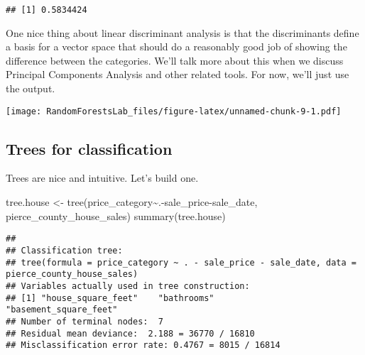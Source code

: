 \documentclass[
]{article}
\newenvironment{Shaded}{\begin{snugshade}}{\end{snugshade}}
\newcommand{\AttributeTok}[1]{\textcolor[rgb]{0.77,0.63,0.00}{#1}}
\newcommand{\FunctionTok}[1]{\textcolor[rgb]{0.00,0.00,0.00}{#1}}
\newcommand{\NormalTok}[1]{#1}
\newcommand{\OtherTok}[1]{\textcolor[rgb]{0.56,0.35,0.01}{#1}}
\newcommand{\SpecialCharTok}[1]{\textcolor[rgb]{0.00,0.00,0.00}{#1}}
\begin{document}
\begin{verbatim}
## [1] 0.5834424
\end{verbatim}

One nice thing about linear discriminant analysis is that the
discriminants define a basis for a vector space that should do a
reasonably good job of showing the difference between the categories.
We'll talk more about this when we discuss Principal Components Analysis
and other related tools. For now, we'll just use the output.

\begin{Shaded}
\end{Shaded}

\texttt{[image: RandomForestsLab\_files/figure-latex/unnamed-chunk-9-1.pdf]}

\hypertarget{trees-for-classification}{%
\subsection{Trees for classification}\label{trees-for-classification}}

Trees are nice and intuitive. Let's build one.

\begin{Shaded}
\begin{Highlighting}[]
\NormalTok{tree.house }\OtherTok{\textless{}{-}} \FunctionTok{tree}\NormalTok{(price\_category}\SpecialCharTok{\textasciitilde{}}\NormalTok{.}\SpecialCharTok{{-}}\NormalTok{sale\_price}\SpecialCharTok{{-}}\NormalTok{sale\_date, pierce\_county\_house\_sales)}
\FunctionTok{summary}\NormalTok{(tree.house)}
\end{Highlighting}
\end{Shaded}

\begin{verbatim}
## 
## Classification tree:
## tree(formula = price_category ~ . - sale_price - sale_date, data = pierce_county_house_sales)
## Variables actually used in tree construction:
## [1] "house_square_feet"    "bathrooms"            "basement_square_feet"
## Number of terminal nodes:  7 
## Residual mean deviance:  2.188 = 36770 / 16810 
## Misclassification error rate: 0.4767 = 8015 / 16814
\end{verbatim}
\end{document}
